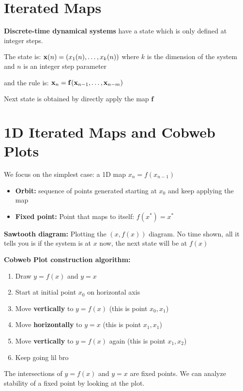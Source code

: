 \section*{Iterated Maps}

\textbf{Discrete-time dynamical systems} have a state which is only 
defined at integer steps. 

The state is:
$\mathbf{x}(n) = (x_1(n), \dots, x_k(n))$
where $k$ is the dimension of the system and $n$ is an integer step parameter

and the rule is: $\mathbf{x}_n = \mathbf{f}(\mathbf{x}_{n-1}, \dots, \mathbf{x}_{n-m})$

Next state is obtained by directly apply the map $\mathbf{f}$

\section*{1D Iterated Maps and Cobweb Plots}

We focus on the simplest case: a 1D map $x_n = f(x_{n-1})$

\begin{itemize}
    \item \textbf{Orbit:} sequence of points generated starting at $x_0$
    and keep applying the map 
    \item \textbf{Fixed point:} Point that maps to itself: $f(x^*) = x^*$
\end{itemize}

\textbf{Sawtooth diagram:} Plotting the $(x, f(x))$ diagram. No time shown, 
all it tells you is if the system is at $x$ now, the next state will be at $f(x)$

\textbf{Cobweb Plot construction algorithm:}

\begin{enumerate}
    \item Draw $y=f(x)$ and $y=x$
    \item Start at initial point $x_0$ on horizontal axis 
    \item Move \textbf{vertically} to $y = f(x)$ (this is point $x_0, x_1$)
    \item Move \textbf{horizontally} to $y = x$ (this is point $x_1, x_1$)
    \item Move \textbf{vertically} to $y = f(x)$ again (this is point $x_1, x_2$)
    \item Keep going lil bro
\end{enumerate}

The intersections of $y = f(x)$ and $y = x$ are fixed points. We can analyze 
stability of a fixed point by looking at the plot.

